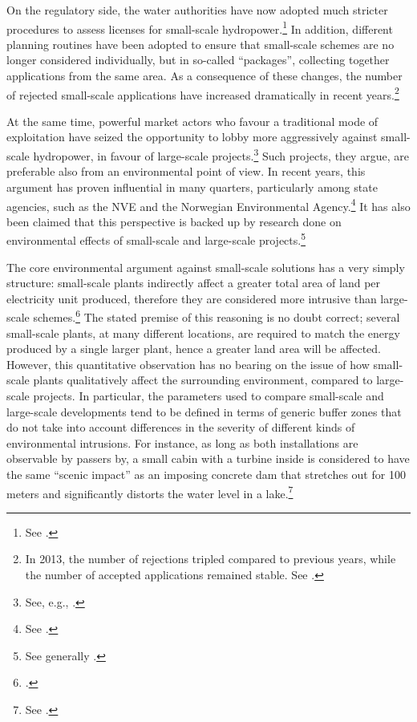 On the regulatory side, the water authorities have now adopted much stricter procedures to assess licenses for small-scale hydropower.\footnote{See \cite{lie12}.} In addition, different planning routines have been adopted to ensure that small-scale schemes are no longer considered individually, but in so-called ``packages'', collecting together applications from the same area. As a consequence of these changes, the number of rejected small-scale applications have increased dramatically in recent years.\footnote{In 2013, the number of rejections tripled compared to previous years, while the number of accepted applications remained stable. See \cite{sunde14b}.}

At the same time, powerful market actors who favour a traditional mode of exploitation have seized the opportunity to lobby more aggressively against small-scale hydropower, in favour of large-scale projects.\footnote{See, e.g., \cite{alexandersen14}.} Such projects, they argue, are preferable also from an environmental point of view. In recent years, this argument has proven influential in many quarters, particularly among state agencies, such as the NVE and the Norwegian Environmental Agency.\footnote{See \cite{nilsen11}.} It has also been claimed that this perspective is backed up by research done on environmental effects of small-scale and large-scale projects.\footnote{See generally \cite{bakken12,bakken14}.}

The core environmental argument against small-scale solutions has a very simply structure: small-scale plants indirectly affect a greater total area of land per electricity unit produced, therefore they are considered more intrusive than large-scale schemes.\footcite[96-99]{bakken14} The stated premise of this reasoning is no doubt correct; several small-scale plants, at many different locations, are required to match the energy produced by a single larger plant, hence a greater land area will be affected. However, this quantitative observation has no bearing on the issue of how small-scale plants qualitatively affect the surrounding environment, compared to large-scale projects. In particular, the parameters used to compare small-scale and large-scale developments tend to be defined in terms of generic buffer zones that do not take into account differences in the severity of different kinds of environmental intrusions. For instance, as long as both installations are observable by passers by, a small cabin with a turbine inside is considered to have the same ``scenic impact'' as an imposing concrete dam that stretches out for 100 meters and significantly distorts the water level in a lake.\footnote{See \cite[95]{bakken14}.}

